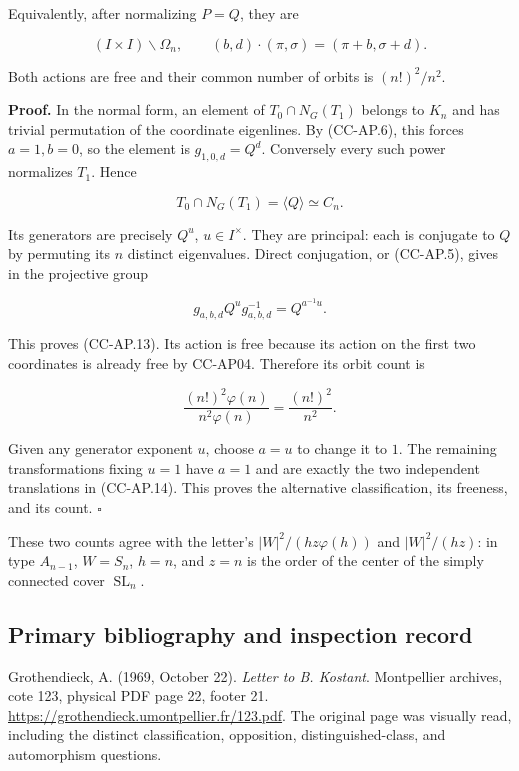 \documentclass[11pt,a4paper]{article}
\theoremstyle{definition}\newtheorem{definition}[theorem]{Definition}
\theoremstyle{remark}\newtheorem{remark}[theorem]{Remark}
\begin{document}
Equivalently, after normalizing \(P=Q\), they are

\[
 (I\times I)\backslash\Omega_n,\qquad
 (b,d)\cdot(\pi,\sigma)=(\pi+b,\sigma+d).
 \tag{CC-AP.14}
\]

Both actions are free and their common number of orbits is
\((n!)^2/n^2\).

\textbf{Proof.} In the normal form, an element of \(T_0\cap N_G(T_1)\)
belongs to \(K_n\) and has trivial permutation of the coordinate
eigenlines. By (CC-AP.6), this forces \(a=1,b=0\), so the element is
\(g_{1,0,d}=Q^d\). Conversely every such power normalizes \(T_1\). Hence

\[
 T_0\cap N_G(T_1)=\langle Q\rangle\simeq C_n.
\]

Its generators are precisely \(Q^u\), \(u\in I^\times\). They are
principal: each is conjugate to \(Q\) by permuting its \(n\) distinct
eigenvalues. Direct conjugation, or (CC-AP.5), gives in the projective
group

\[
 g_{a,b,d}Q^u g_{a,b,d}^{-1}=Q^{a^{-1}u}.
\]

This proves (CC-AP.13). Its action is free because its action on the
first two coordinates is already free by CC-AP04. Therefore its orbit
count is

\[
 \frac{(n!)^2\varphi(n)}{n^2\varphi(n)}
 =\frac{(n!)^2}{n^2}.
\]

Given any generator exponent \(u\), choose \(a=u\) to change it to
\(1\). The remaining transformations fixing \(u=1\) have \(a=1\) and are
exactly the two independent translations in (CC-AP.14). This proves the
alternative classification, its freeness, and its count. \(\square\)

These two counts agree with the letter's \(|W|^2/(hz\varphi(h))\) and
\(|W|^2/(hz)\): in type \(A_{n-1}\), \(W=S_n\), \(h=n\), and \(z=n\) is
the order of the center of the simply connected cover
\(\operatorname{SL}_n\).

\subsection{Primary bibliography and inspection
record}\label{primary-bibliography-and-inspection-record}

Grothendieck, A. (1969, October 22). \emph{Letter to B. Kostant}.
Montpellier archives, cote 123, physical PDF page 22, footer 21.
\url{https://grothendieck.umontpellier.fr/123.pdf}. The original page was
visually read, including the distinct classification, opposition,
distinguished-class, and automorphism questions.
\end{document}
